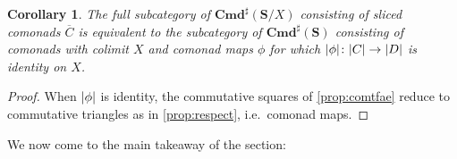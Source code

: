 \documentclass[11pt, oneside, article]{memoir}
\theoremstyle{plain}
\newtheorem{corollary}[theorem]{Corollary}
\theoremstyle{definition}
\theoremstyle{remark}
\DeclarePairedDelimiter{\abs}{\lvert}{\rvert}
\newcommand{\namedcat}[1]{\mathbf{#1}}
\newcommand{\cat}[1]{\mathbf{#1}}
\newcommand{\Set}{\namedcat{Set}}
\newcommand{\Com}{\namedcat{Cmd}^\sharp}
\newcommand{\CoalgOn}[2]{{#2}^{#1}}
\newcommand{\CoalgSet}[1]{\CoalgOn{#1}{\Set}}
\newcommand{\CoalgS}[1]{\CoalgOn{#1}{\bS}}
\newcommand{\clift}[1]{\overline{#1}}
\newcommand{\pts}[1]{{\abs{#1}}}
\newcommand{\qpts}[1]{\pts{#1}}
\newcommand{\one}[1]{\pts{#1}}
\newcommand{\carr}{\Sigma}
\newcommand{\car}[1]{\carr^{#1}}
\newcommand{\carC}{\car{\cC}}
\newcommand{\carD}{\car{\cD}}
\newcommand{\com}[2]{{#1}^{#2}}
\newcommand{\cmnd}[1]{{#1}}
\newcommand{\xX}{X}
\newcommand{\cC}{\cmnd{C}}
\newcommand{\cD}{\cmnd{D}}
\newcommand{\bS}{\cat{S}}
\newcommand{\CS}{\CoalgS{\cC}}
\newcommand{\DSet}{\CoalgSet{\cD}}
\begin{document}
\begin{corollary}\label{lem:liftedcategory}
  The full subcategory of $\Com(\bS/\xX)$ consisting of sliced
  comonads $\clift{\cC}$ is equivalent to the subcategory of
  $\Com(\bS)$ consisting of comonads with colimit $\xX$ and comonad
  maps $\phi$ for which $\one{\phi} \colon \one{\cC} \to \one{\cD}$ is
  identity on $\xX$.
\end{corollary}
\begin{proof}
  When $\one{\phi}$ is identity, the commutative squares of
  \cref{prop:comtfae} reduce to commutative triangles as in
  \cref{prop:respect}, i.e.\ comonad maps.
\end{proof}





We now come to the main takeaway of the section:
\end{document}
